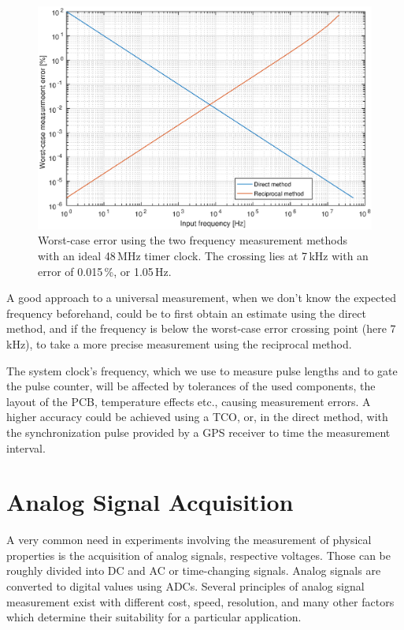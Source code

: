 \begin{figure}[h]
	\centering
	\includegraphics[width=\textwidth] {img/freqmethods.eps}
	\caption[Frequency measurement methods comparison]{\label{fig:freqmethods-graph}Worst-case error using the two frequency measurement methods with an ideal 48\,MHz timer clock. The crossing lies at 7\,kHz with an error of 0.015\,\%, or 1.05\,Hz.}
\end{figure}

A good approach to a universal measurement, when we don't know the expected frequency beforehand, could be to first obtain an estimate using the direct method, and if the frequency is below the worst-case error crossing point (here 7\,kHz), to take a more precise measurement using the reciprocal method.

The system clock's frequency, which we use to measure pulse lengths and to gate the pulse counter, will be affected by tolerances of the used components, the layout of the \gls{PCB}, temperature effects etc., causing measurement errors. A higher accuracy could be achieved using a \gls{TCO}, or, in the direct method, with the synchronization pulse provided by a \gls{GPS} receiver to time the measurement interval.

\section{Analog Signal Acquisition} \label{sec:theory-adc}

A very common need in experiments involving the measurement of physical properties is the acquisition of analog signals, respective voltages. Those can be roughly divided into \gls{DC} and \gls{AC} or time-changing signals. Analog signals are converted to digital values using \glspl{ADC}. Several principles of analog signal measurement exist with different cost, speed, resolution, and many other factors which determine their suitability for a particular application.

